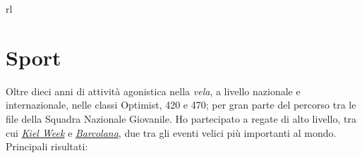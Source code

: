 \documentclass[10pt]{article} %
\begin{document}
\begin{supertabular}{rl}



\end{supertabular}


\vspace{15pt}
\section{Sport}

Oltre dieci anni di attivit\`a agonistica nella \emph{vela}, a livello nazionale e internazionale, nelle classi Optimist, 420 e 470; per gran parte del percorso tra le file della Squadra Nazionale Giovanile. Ho partecipato a regate di alto livello, tra cui \href{https://www.kieler-woche.de}{\textit{Kiel Week}} e \href{https://www.barcolana.it}{\textit{Barcolana}}, due tra gli eventi velici pi\`u importanti al mondo. Principali risultati:\\

\end{document}
